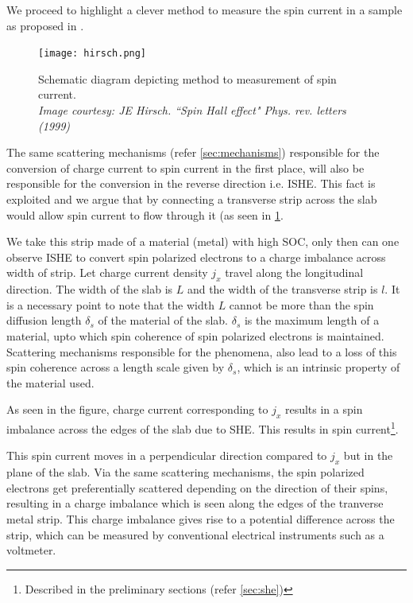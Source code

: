 We proceed to highlight a clever method to measure the spin current in a sample as proposed in \cite{hirsch1999spin}.

\begin{figure}[h!]
    \centering
    \texttt{[image: hirsch.png]}
    \caption{Schematic diagram depicting method to measurement of spin current.\\ \vspace{0.2cm} \textit{Image courtesy: JE Hirsch. ``Spin Hall effect" Phys. rev. letters (1999)}}
    \label{fig:hirsch-measure}
\end{figure}

The same scattering mechanisms (refer \cref{sec:mechanisms}) responsible for the conversion of charge current to spin current in the first place, will also be responsible for the conversion in the reverse direction i.e. ISHE.
This fact is exploited and we argue that by connecting a transverse strip across the slab would allow spin current to flow through it (as seen in \cref{fig:hirsch-measure}.

We take this strip made of a material (metal) with high SOC, only then can one observe ISHE to convert spin polarized electrons to a charge imbalance across width of strip.
Let charge current density \( j_x \) travel along the longitudinal direction.
The width of the slab is \( L \) and the width of the transverse strip is \( l \).
It is a necessary point to note that the width \( L \) cannot be more than the spin diffusion length \( \delta_s \) of the material of the slab.
\( \delta_s \) is the maximum length of a material, upto which spin coherence of spin polarized electrons is maintained.
Scattering mechanisms responsible for the phenomena, also lead to a loss of this spin coherence across a length scale given by \( \delta_s \), which is an intrinsic property of the material used.

As seen in the figure, charge current corresponding to \( j_x \) results in a spin imbalance across the edges of the slab due to SHE.
This results in spin current\footnote{Described in the preliminary sections (refer \cref{sec:she})}.

This spin current moves in a perpendicular direction compared to \( j_x \) but in the plane of the slab.
Via the same scattering mechanisms, the spin polarized electrons get preferentially scattered depending on the direction of their spins, resulting in a charge imbalance which is seen along the edges of the tranverse metal strip.
This charge imbalance gives rise to a potential difference across the strip, which can be measured by conventional electrical instruments such as a voltmeter.

